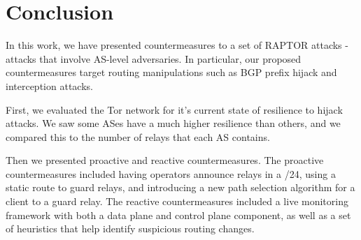\section{Conclusion}

In this work, we have presented countermeasures to a set of RAPTOR attacks - attacks that 
involve AS-level adversaries.  In particular, our proposed countermeasures target routing 
manipulations such as BGP prefix hijack and interception attacks.  

First, we evaluated the Tor network for it's current state of resilience to hijack attacks.  
We saw some ASes have a much higher resilience than others, and we compared this to the number 
of relays that each AS contains.  

Then we presented proactive and reactive countermeasures.  The proactive countermeasures included 
having operators announce relays in a /24, using a static route to guard relays, and introducing 
a new path selection algorithm for a client to a guard relay.  The reactive countermeasures included 
a live monitoring framework with both a data plane and control plane component, as well as a set of 
heuristics that help identify suspicious routing changes.  
